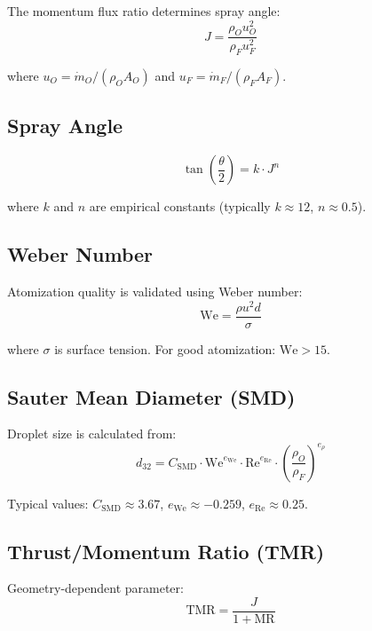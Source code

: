 \documentclass[12pt,a4paper]{article}
\newcommand{\mdot}{\dot{m}}
\newcommand{\MR}{\text{MR}}
\begin{document}
The momentum flux ratio determines spray angle:
\begin{equation}
J = \frac{\rho_O u_O^2}{\rho_F u_F^2}
\end{equation}

where $u_O = \mdot_O/(\rho_O A_O)$ and $u_F = \mdot_F/(\rho_F A_F)$.

\subsection{Spray Angle}

\begin{equation}
\tan\left(\frac{\theta}{2}\right) = k \cdot J^n
\end{equation}

where $k$ and $n$ are empirical constants (typically $k \approx 12$, $n \approx 0.5$).

\subsection{Weber Number}

Atomization quality is validated using Weber number:
\begin{equation}
\text{We} = \frac{\rho u^2 d}{\sigma}
\end{equation}

where $\sigma$ is surface tension. For good atomization: $\text{We} > 15$.

\subsection{Sauter Mean Diameter (SMD)}

Droplet size is calculated from:
\begin{equation}
d_{32} = C_{\text{SMD}} \cdot \text{We}^{e_{\text{We}}} \cdot \text{Re}^{e_{\text{Re}}} \cdot \left(\frac{\rho_O}{\rho_F}\right)^{e_{\rho}}
\end{equation}

Typical values: $C_{\text{SMD}} \approx 3.67$, $e_{\text{We}} \approx -0.259$, $e_{\text{Re}} \approx 0.25$.

\subsection{Thrust/Momentum Ratio (TMR)}

Geometry-dependent parameter:
\begin{equation}
\text{TMR} = \frac{J}{1 + \MR}
\end{equation}
\end{document}
